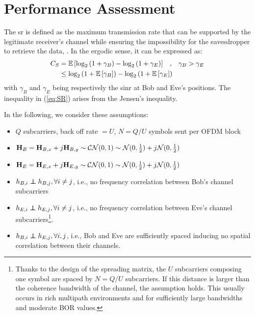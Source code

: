 \section{Performance Assessment} 
\label{sec:perf}
The \gls{sr} is defined as the maximum transmission rate that can be supported by the legitimate receiver's channel while ensuring the impossibility for the eavesdropper to retrieve the data, \cite{7348007}. In the ergodic sense, it can be expressed as:
\begin{equation}
\begin{split}
    C_S &=  \mathbb{E} \left[\log_2{\left(1+\gamma_B\right)} - \log_2{\left(1+\gamma_E\right)}\right] \; \; \; , \; \; \;  \gamma_B > \gamma_E \\
    &\leq   \log_2 \left( 1+ \mathbb{E} \left[\gamma_B\right] \right) - \log_2 \left( 1+ \mathbb{E} \left[\gamma_E\right]\right) 
    \end{split}
    \label{eq:SR}
\end{equation}
with $\gamma_B$ and $\gamma_E$ being respectively the \gls{sinr} at Bob and Eve's positions. The inequality in (\ref{eq:SR}) arises from the Jensen's inequality. 


In the following, we consider these assumptions:
\begin{itemize}
\item $Q$ subcarriers, back off rate $= U$, $N = Q/U$ symbols sent per OFDM block
\item  $\boldsymbol{\mathrm{H}}_B = \boldsymbol{\mathrm{H}}_{B,x} + j\boldsymbol{\mathrm{H}}_{B,y} \sim \mathcal{CN}(0,1) \sim \mathcal{N}(0,\frac{1}{2}) + j \mathcal{N}(0,\frac{1}{2}) $
\item  $\boldsymbol{\mathrm{H}}_E = \boldsymbol{\mathrm{H}}_{E,x} + j\boldsymbol{\mathrm{H}}_{E,y} \sim \mathcal{CN}(0,1) \sim \mathcal{N}(0,\frac{1}{2}) + j \mathcal{N}(0,\frac{1}{2}) $
\item $h_{B,i} \independent h_{B,j}, \forall i \neq j$, i.e., no frequency correlation between Bob's channel subcarriers
\item $h_{E,i} \independent h_{E,j}, \forall i \neq j$, i.e., no frequency correlation between Eve's channel subcarriers\footnote{Thanks to the design of the spreading matrix, the $U$ subcarriers composing one symbol are spaced by $N = Q/U$ subcarriers. If this distance is larger than the coherence bandwidth of the channel, the assumption holds. This usually occurs in rich multipath environments and for sufficiently large bandwidths and moderate BOR values.}.
\item $h_{B,i} \independent h_{E,j}, \forall i,j$, i.e., Bob and Eve are sufficiently spaced inducing no spatial correlation between their channels.
\end{itemize}



